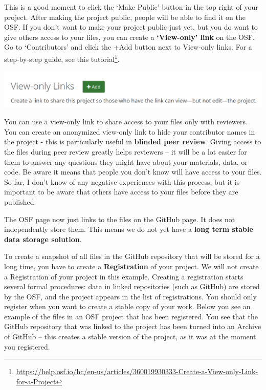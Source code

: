 \documentclass[
  oneside]{krantz}
\renewcommand{\href}[2]{#2\footnote{\url{#1}}}
\begin{document}
This is a good moment to click the `Make Public' button in the top right of your
project. After making the project public, people will be able to find it on the
OSF. If you don't want to make your project public just yet, but you do want to
give others access to your files, you can create a \textbf{`View-only' link} on the
OSF. Go to `Contributors' and click the +Add button next to View-only links. For
a step-by-step guide, see \href{https://help.osf.io/hc/en-us/articles/360019930333-Create-a-View-only-Link-for-a-Project}{this
tutorial}.

\begin{center}\includegraphics[width=1\linewidth]{images/fd54022300a51d07de93673aac3fb508} \end{center}

You can use a view-only link to share access to your files only with reviewers. You can create an anonymized view-only link to hide your contributor names in the project - this is particularly useful in \textbf{blinded peer review}. Giving access to the files during peer review greatly helps reviewers -- it will be a lot easier for them to answer any questions they might have about your materials, data, or code. Be aware it means that people you don't know will have access to your files. So far, I don't know of any negative experiences with this process, but it is important to be aware that others have access to your files before they are published.

The OSF page now just links to the files on the GitHub page. It does not independently store them. This means we do not yet have a \textbf{long term stable data storage solution}.

To create a snapshot of all files in the GitHub repository that will be stored for a long time, you have to create a \textbf{Registration} of your project. We will not create a Registration of your project in this example. Creating a registration starts several formal procedures: data in linked repositories (such as GitHub) are stored by the OSF, and the project appears in the list of registrations. You should only register when you want to create a stable copy of your work. Below you see an example of the files in an OSF project that has been registered. You see that the GitHub repository that was linked to the project has been turned into an Archive of GitHub -- this creates a stable version of the project, as it was at the moment you registered.
\end{document}
